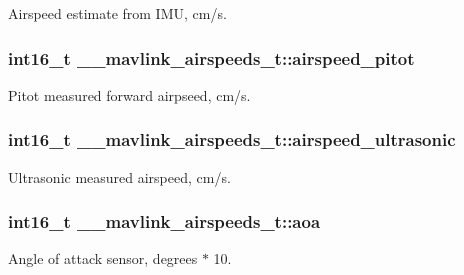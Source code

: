 Airspeed estimate from I\+M\+U, cm/s. 

\hypertarget{struct____mavlink__airspeeds__t_a624eb17f8cc2e74e92940bd8afa01d17}{
\subsubsection[{airspeed\+\_\+pitot}]{\setlength{\rightskip}{0pt plus 5cm}int16\+\_\+t \+\_\+\+\_\+mavlink\+\_\+airspeeds\+\_\+t\+::airspeed\+\_\+pitot}}\label{struct____mavlink__airspeeds__t_a624eb17f8cc2e74e92940bd8afa01d17}


Pitot measured forward airpseed, cm/s. 

\hypertarget{struct____mavlink__airspeeds__t_a6b4adda62acb39bfa6aed555ad5038c3}{
\subsubsection[{airspeed\+\_\+ultrasonic}]{\setlength{\rightskip}{0pt plus 5cm}int16\+\_\+t \+\_\+\+\_\+mavlink\+\_\+airspeeds\+\_\+t\+::airspeed\+\_\+ultrasonic}}\label{struct____mavlink__airspeeds__t_a6b4adda62acb39bfa6aed555ad5038c3}


Ultrasonic measured airspeed, cm/s. 

\hypertarget{struct____mavlink__airspeeds__t_a11cf2db67717170dec997cb2c53f00be}{
\subsubsection[{aoa}]{\setlength{\rightskip}{0pt plus 5cm}int16\+\_\+t \+\_\+\+\_\+mavlink\+\_\+airspeeds\+\_\+t\+::aoa}}\label{struct____mavlink__airspeeds__t_a11cf2db67717170dec997cb2c53f00be}


Angle of attack sensor, degrees $\ast$ 10. 

